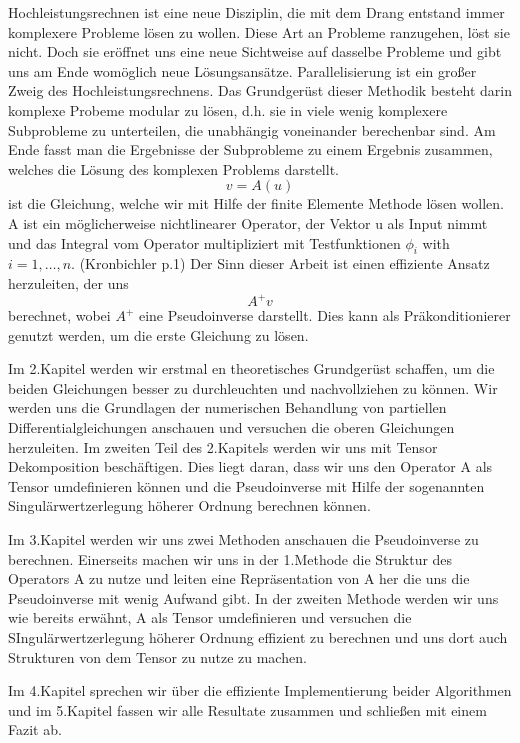 Hochleistungsrechnen ist eine neue Disziplin, die mit dem Drang entstand immer komplexere Probleme lösen zu wollen. Diese Art an Probleme ranzugehen, löst sie nicht. Doch sie eröffnet uns eine neue Sichtweise auf dasselbe Probleme und gibt uns am Ende womöglich neue Lösungsansätze.
Parallelisierung ist ein großer Zweig des Hochleistungsrechnens. Das Grundgerüst dieser Methodik besteht darin komplexe Probeme modular zu lösen, d.h. sie in viele wenig komplexere Subprobleme zu unterteilen, die unabhängig voneinander berechenbar sind. Am Ende fasst man die Ergebnisse der Subprobleme zu einem Ergebnis zusammen, welches die Lösung des komplexen Problems darstellt.
\begin{equation*}
v=A(u)
\end{equation*}
ist die Gleichung, welche wir mit Hilfe der finite Elemente Methode lösen wollen. A ist ein möglicherweise nichtlinearer Operator, der Vektor u als Input nimmt und das Integral vom Operator multipliziert mit  Testfunktionen $\phi_i$ with $i=1,\dots,n$. (Kronbichler p.1) 
Der Sinn dieser Arbeit ist einen effiziente Ansatz herzuleiten, der uns 
\begin{equation*}
A^{+}v
\end{equation*}
berechnet, wobei $A^{+}$ eine Pseudoinverse darstellt. Dies kann als Präkonditionierer genutzt werden, um die erste Gleichung zu lösen.

Im 2.Kapitel werden wir erstmal en theoretisches Grundgerüst schaffen, um die beiden Gleichungen besser zu durchleuchten und nachvollziehen zu können. Wir werden uns die Grundlagen der numerischen Behandlung von partiellen Differentialgleichungen anschauen und versuchen die oberen Gleichungen herzuleiten.
Im zweiten Teil des 2.Kapitels werden wir uns mit Tensor Dekomposition beschäftigen. Dies liegt daran, dass wir uns den Operator A als Tensor umdefinieren können und die Pseudoinverse mit Hilfe der sogenannten Singulärwertzerlegung höherer Ordnung berechnen können.

Im 3.Kapitel werden wir uns zwei Methoden anschauen die Pseudoinverse zu berechnen. Einerseits machen wir uns in der 1.Methode die Struktur des Operators A zu nutze und leiten eine Repräsentation von A her die uns die Pseudoinverse mit wenig Aufwand gibt. In der zweiten Methode werden wir uns wie bereits erwähnt, A als Tensor umdefinieren und versuchen die SIngulärwertzerlegung höherer Ordnung effizient zu berechnen und uns dort auch Strukturen von dem Tensor zu nutze zu machen.

Im 4.Kapitel sprechen wir über die effiziente Implementierung beider Algorithmen und im 5.Kapitel fassen wir alle Resultate zusammen und schließen mit einem Fazit ab.




